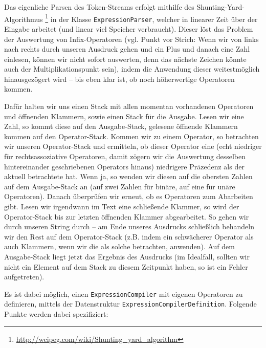 Das eigenliche Parsen des Token-Streams erfolgt mithilfe des
Shunting-Yard-Algorithmus \footnote{\url{http://wcipeg.com/wiki/Shunting_yard_algorithm}} in
der Klasse \texttt{ExpressionParser}, welcher in linearer Zeit über der Eingabe
arbeitet (und linear viel Speicher verbraucht). Dieser löst das Problem der
Auswertung von Infix-Operatoren (vgl. Punkt vor Strich: Wenn wir von links nach
rechts durch unseren Ausdruck gehen und ein Plus und danach eine Zahl einlesen,
können wir nicht sofort auswerten, denn das nächste Zeichen könnte auch der
Multiplikationspunkt sein), indem die Anwendung dieser weitestmöglich
hinausgezögert wird -- bis eben klar ist, ob noch höherwertige Operatoren kommen.

Dafür halten wir uns einen Stack mit allen momentan vorhandenen Operatoren und
öffnenden Klammern, sowie einen Stack für die Ausgabe. Lesen wir eine Zahl, so
kommt diese auf den Ausgabe-Stack, gelesene öffnende Klammern kommen auf den
Operator-Stack. Kommen wir zu einem Operator, so betrachten wir unseren
Operator-Stack und ermitteln, ob dieser Operator eine (echt niedriger für
rechtsassoziative Operatoren, damit zögern wir die Auswertung desselben
hintereinander geschriebenen Operators hinaus) niedrigere Präzedenz als der
aktuell betrachtete hat. Wenn ja, so wenden wir diesen auf die obersten Zahlen
auf dem Ausgabe-Stack an (auf zwei Zahlen für binäre, auf eine für unäre
Operatoren). Danach überprüfen wir erneut, ob es Operatoren zum Abarbeiten gibt.
Lesen wir irgendwann im Text eine schließende Klammer, so wird der
Operator-Stack bis zur letzten öffnenden Klammer abgearbeitet. So gehen wir
durch unseren String durch – am Ende unseres Ausdrucks schließlich behandeln wir
den Rest auf dem Operator-Stack (z.B. indem ein schwächerer Operator als auch
Klammern, wenn wir die als solche betrachten, anwenden). Auf dem Ausgabe-Stack
liegt jetzt das Ergebnis des Ausdrucks (im Idealfall, sollten wir nicht ein
Element auf dem Stack zu diesem Zeitpunkt haben, so ist ein Fehler aufgetreten).

Es ist dabei möglich, einen \texttt{ExpressionCompiler} mit eigenen Operatoren
zu definieren, mittels der Datenstruktur \texttt{ExpressionCompilerDefinition}.
Folgende Punkte werden dabei spezifiziert:

